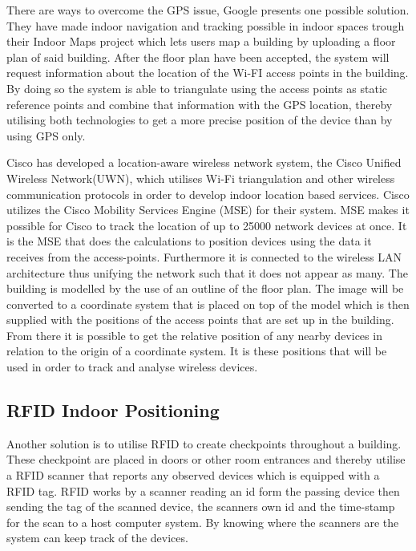 There are ways to overcome the GPS issue, Google presents one possible solution. They have made indoor navigation and tracking possible in indoor spaces trough their Indoor Maps project \cite{IPSoverGPS} which lets users map a building by uploading a floor plan of said building. After the floor plan have been accepted, the system will request information about the location of the Wi-FI access points in the building. By doing so the system is able to triangulate using the access points as static reference points and combine that information with the GPS location, thereby utilising both technologies to get a more precise position of the device than by using GPS only.

Cisco has developed a location-aware wireless network system, the Cisco Unified Wireless Network(UWN), which utilises Wi-Fi triangulation\cite{CiscoTri} and other wireless communication protocols in order to develop indoor location based services\cite{uwn}.
Cisco utilizes the Cisco Mobility Services Engine (MSE) for their system. MSE makes it possible for Cisco to track the location of up to 25000 network devices at once. It is the MSE that does the calculations to position devices using the data it receives from the access-points. Furthermore it is connected to the wireless LAN architecture thus unifying the network such that it does not appear as many\cite{ciscoMSE}.
The building is modelled by the use of an outline of the floor plan. The image will be converted to a coordinate system that is placed on top of the model which is then supplied with the positions of the access points that are set up in the building. From there it is possible to get the relative position of any nearby devices in relation to the origin of a coordinate system. It is these positions that will be used in order to track and analyse wireless devices.

\subsection{RFID Indoor Positioning}
Another solution is to utilise RFID to create checkpoints throughout a building. These checkpoint are placed in doors or other room entrances and thereby utilise a RFID scanner that reports any observed devices which is equipped with a RFID tag\cite{indoor_bin}. 
RFID works by a scanner reading an id form the passing device then sending the tag of the scanned device, the scanners own id and the time-stamp for the scan to a host computer system. By knowing where the scanners are the system can keep track of the devices\cite{RFIDjournal}.

